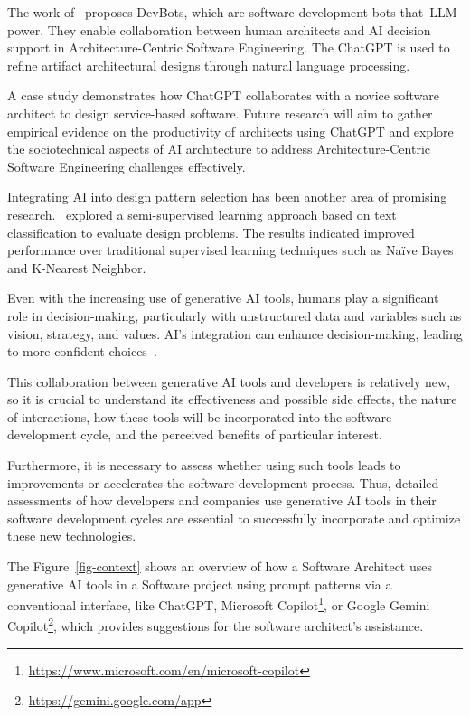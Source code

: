 The work of~\textcite{Ahmad2023towards} proposes DevBots, which are software development bots that~\ac{LLM} power. They enable collaboration between human architects and AI decision support in Architecture-Centric Software Engineering. The ChatGPT is used to refine artifact architectural designs through natural language processing. 

A case study demonstrates how ChatGPT collaborates with a novice software architect to design service-based software. Future research will aim to gather empirical evidence on the productivity of architects using ChatGPT and explore the sociotechnical aspects of AI architecture to address Architecture-Centric Software Engineering challenges effectively.

Integrating AI into design pattern selection has been another area of promising research.~\textcite{Naghdipour2023Semi} explored a semi-supervised learning approach based on text classification to evaluate design problems. The results indicated improved performance over traditional supervised learning techniques such as Naïve Bayes and K-Nearest Neighbor. 

Even with the increasing use of generative AI tools, humans play a significant role in decision-making, particularly with unstructured data and variables such as vision, strategy, and values. AI's integration can enhance decision-making, leading to more confident choices~\cite{Colson2019}.

This collaboration between generative AI tools and developers is relatively new, so it is crucial to understand its effectiveness and possible side effects, the nature of interactions, how these tools will be incorporated into the software development cycle, and the perceived benefits of particular interest. 

Furthermore, it is necessary to assess whether using such tools leads to improvements or accelerates the software development process. Thus, detailed assessments of how developers and companies use generative AI tools in their software development cycles are essential to successfully incorporate and optimize these new technologies. 

The Figure~\ref{fig-context}  shows an overview of how a Software Architect uses generative AI tools in a Software project using prompt patterns via a conventional interface, like ChatGPT, Microsoft Copilot\footnote{\url{https://www.microsoft.com/en/microsoft-copilot}}, or Google Gemini Copilot\footnote{\url{https://gemini.google.com/app}}, which provides suggestions for the software architect's assistance.

